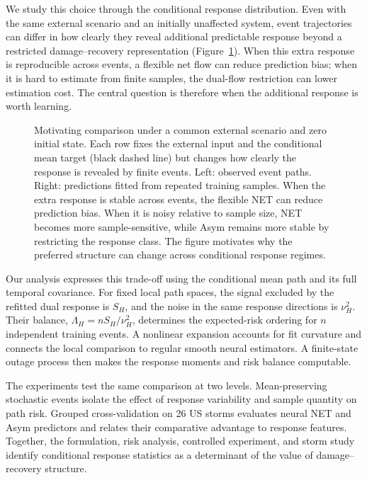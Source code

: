 We study this choice through the conditional response distribution. Even with the same external scenario and an initially unaffected system, event trajectories can differ in how clearly they reveal additional predictable response beyond a restricted damage--recovery representation (Figure~\ref{fig:paths}). When this extra response is reproducible across events, a flexible net flow can reduce prediction bias; when it is hard to estimate from finite samples, the dual-flow restriction can lower estimation cost. The central question is therefore when the additional response is worth learning.

\begin{figure}[!t]
\centering
{}
\caption{Motivating comparison under a common external scenario and zero initial state. Each row fixes the external input and the conditional mean target (black dashed line) but changes how clearly the response is revealed by finite events. Left: observed event paths. Right: predictions fitted from repeated training samples. When the extra response is stable across events, the flexible NET can reduce prediction bias. When it is noisy relative to sample size, NET becomes more sample-sensitive, while Asym remains more stable by restricting the response class. The figure motivates why the preferred structure can change across conditional response regimes.}
\label{fig:paths}
\end{figure}

Our analysis expresses this trade-off using the conditional mean path and its full temporal covariance. For fixed local path spaces, the signal excluded by the refitted dual response is $S_H$, and the noise in the same response directions is $\nu_H^2$. Their balance, $\Lambda_H=nS_H/\nu_H^2$, determines the expected-risk ordering for $n$ independent training events. A nonlinear expansion accounts for fit curvature and connects the local comparison to regular smooth neural estimators. A finite-state outage process then makes the response moments and risk balance computable.

The experiments test the same comparison at two levels. Mean-preserving stochastic events isolate the effect of response variability and sample quantity on path risk. Grouped cross-validation on 26 US storms evaluates neural NET and Asym predictors and relates their comparative advantage to response features. Together, the formulation, risk analysis, controlled experiment, and storm study identify conditional response statistics as a determinant of the value of damage--recovery structure.

